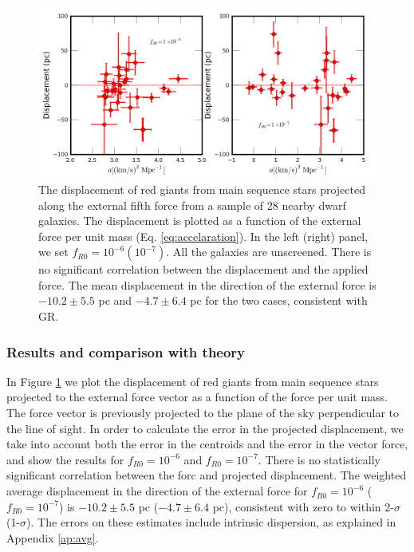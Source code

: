 \documentclass[useAMS,usenatbib,twocolumn]{mn2e}
\begin{document}
\begin{figure}
\includegraphics[scale=0.5]{figures/dispprojforce.png}
  \caption{The displacement of red giants from main sequence stars projected along 
the external fifth force from a sample of 28 nearby dwarf galaxies. The displacement is plotted as a function of the external force per unit mass
(Eq. \ref{eq:accelaration}). 
In the left (right) panel, we set $f_{R0}=10^{-6} (10^{-7})$. 
All the galaxies are unscreened. There is no significant correlation between
the
displacement and the applied force.
 The mean displacement in the direction of the 
external force is $-10.2\pm5.5$ pc  and $-4.7\pm6.4$ pc for
the two cases, consistent with GR. 
\label{fig:rgdispprojforce}}
\end{figure}

\subsubsection{Results and comparison with theory}
In Figure \ref{fig:rgdispprojforce} we plot the displacement of red
giants from  main sequence stars projected to the external force vector as a 
function of the force per unit mass. The force vector is previously
projected to the plane of the sky perpendicular to the line of sight.
In order to calculate the error in the projected displacement, 
we take into account both the error in the centroids and the error in the
vector force, and show the results for $f_{R0}=10^{-6}$ and $f_{R0}=10^{-7}$.
There is no statistically significant correlation between the forc and
projected displacement.
The weighted average displacement in the direction of the 
external force for $f_{R0} = 10^{-6}$ ($f_{R0} = 10^{-7}$) is
$-10.2\pm5.5$ pc ($-4.7\pm6.4$ pc),
consistent with zero to within 2-$\sigma$ (1-$\sigma$).
The errors on these estimates include intrinsic dispersion, as explained
in Appendix \ref{ap:avg}.
\end{document}
